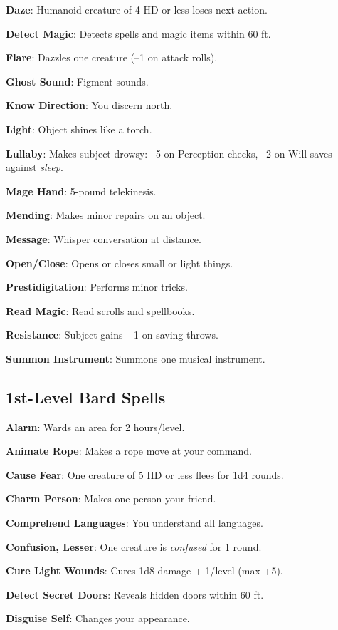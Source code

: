 \textbf{Daze}: Humanoid creature of 4 HD or less loses next action.

\textbf{Detect Magic}: Detects spells and magic items within 60 ft.

\textbf{Flare}: Dazzles one creature (--1 on attack rolls).

\textbf{Ghost Sound}: Figment sounds.

\textbf{Know Direction}: You discern north.

\textbf{Light}: Object shines like a torch.

\textbf{Lullaby}: Makes subject drowsy: --5 on Perception checks, --2 on Will saves against \textit{sleep}.

\textbf{Mage Hand}: 5-pound telekinesis.

\textbf{Mending}: Makes minor repairs on an object.

\textbf{Message}: Whisper conversation at distance.

\textbf{Open/Close}: Opens or closes small or light things.

\textbf{Prestidigitation}: Performs minor tricks.

\textbf{Read Magic}: Read scrolls and spellbooks.

\textbf{Resistance}: Subject gains +1 on saving throws.

\textbf{Summon Instrument}: Summons one musical instrument.

\subsection{1st-Level Bard Spells}


\textbf{Alarm}: Wards an area for 2 hours/level.

\textbf{Animate Rope}: Makes a rope move at your command.

\textbf{Cause Fear}: One creature of 5 HD or less flees for 1d4 rounds.

\textbf{Charm Person}: Makes one person your friend.

\textbf{Comprehend Languages}: You understand all languages.

\textbf{Confusion, Lesser}: One creature is \textit{confused }for 1 round.

\textbf{Cure Light Wounds}: Cures 1d8 damage + 1/level (max +5).

\textbf{Detect Secret Doors}: Reveals hidden doors within 60 ft.

\textbf{Disguise Self}: Changes your appearance.

